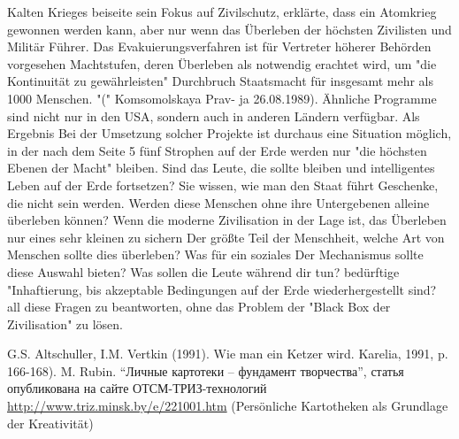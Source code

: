 \documentclass[11pt,a4paper]{article}
\begin{document}
Kalten Krieges beiseite sein Fokus auf Zivilschutz, erklärte, dass ein
Atomkrieg gewonnen werden kann, aber nur wenn das Überleben der höchsten
Zivilisten und Militär Führer. Das Evakuierungsverfahren ist für Vertreter
höherer Behörden vorgesehen Machtstufen, deren Überleben als notwendig
erachtet wird, um "die Kontinuität zu gewährleisten" Durchbruch Staatsmacht
für insgesamt mehr als 1000 Menschen. "(" Komsomolskaya Prav- ja 26.08.1989).
Ähnliche Programme sind nicht nur in den USA, sondern auch in anderen Ländern
verfügbar. Als Ergebnis Bei der Umsetzung solcher Projekte ist durchaus eine
Situation möglich, in der nach dem Seite 5 fünf Strophen auf der Erde werden
nur "die höchsten Ebenen der Macht" bleiben. Sind das Leute, die sollte
bleiben und intelligentes Leben auf der Erde fortsetzen?  Sie wissen, wie man
den Staat führt Geschenke, die nicht sein werden. Werden diese Menschen ohne
ihre Untergebenen alleine überleben können?  Wenn die moderne Zivilisation in
der Lage ist, das Überleben nur eines sehr kleinen zu sichern Der größte Teil
der Menschheit, welche Art von Menschen sollte dies überleben? Was für ein
soziales Der Mechanismus sollte diese Auswahl bieten? Was sollen die Leute
während dir tun?  bedürftige "Inhaftierung, bis akzeptable Bedingungen auf der
Erde wiederhergestellt sind?  all diese Fragen zu beantworten, ohne das
Problem der "Black Box der Zivilisation" zu lösen.

\begin{thebibliography}{xxx}
 G.S. Altschuller, I.M. Vertkin (1991). Wie man ein
  Ketzer wird.  Karelia, 1991, p.  166-168).
 M. Rubin. “Личные картотеки – фундамент творчества”, статья
  опубликована на сайте ОТСМ-ТРИЗ-технологий
  \url{http://www.triz.minsk.by/e/221001.htm} (Persönliche Kartotheken als
  Grundlage der Kreativität)
\end{thebibliography}
\end{document}
